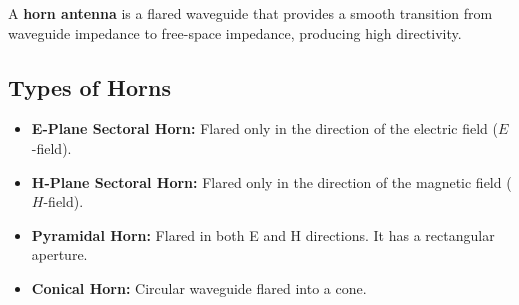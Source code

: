 \documentclass[12pt,a4paper]{article}
\begin{document}
A \textbf{horn antenna} is a flared waveguide that provides a smooth transition from waveguide impedance to free-space impedance, producing high directivity.

\subsection{Types of Horns}
\begin{itemize}[leftmargin=*, itemsep=3pt]
  \item \textbf{E-Plane Sectoral Horn:} Flared only in the direction of the electric field ($E$-field).
  \item \textbf{H-Plane Sectoral Horn:} Flared only in the direction of the magnetic field ($H$-field).
  \item \textbf{Pyramidal Horn:} Flared in both E and H directions. It has a rectangular aperture.
  \item \textbf{Conical Horn:} Circular waveguide flared into a cone.
\end{itemize}
\end{document}
